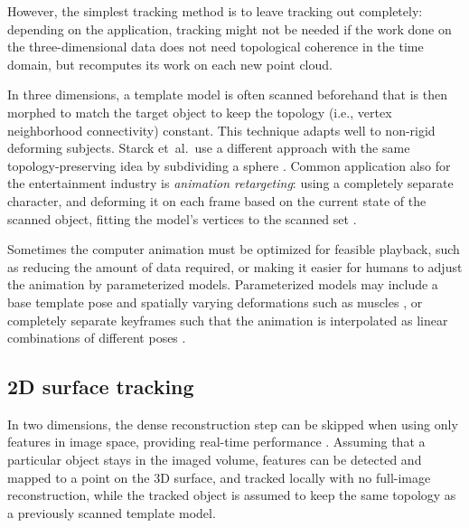 However, the simplest tracking method is to leave tracking out completely: depending on the application, tracking might not be needed if the work done on the three-dimensional data does not need topological coherence in the time domain, but recomputes its work on each new point cloud.


In three dimensions, a template model is often scanned beforehand that is then morphed to match the target object to keep the topology (i.e., vertex neighborhood connectivity) constant.
This technique adapts well to non-rigid deforming subjects. \cite{bojsen2012tracking,li2009robust}
Starck et~al.\ use a different approach with the same topology-preserving idea by subdividing a sphere \cite{starck2007surface}.
Common application also for the entertainment industry is \emph{animation retargeting}: using a completely separate character, and deforming it on each frame based on the current state of the scanned object, fitting the model's vertices to the scanned set \cite{sumner2004deformation}.

Sometimes the computer animation must be optimized for feasible playback, such as reducing the amount of data required, or making it easier for humans to adjust the animation by parameterized models.
Parameterized models may include a base template pose and spatially varying deformations such as muscles \cite{waters1987muscle}, or completely separate keyframes such that the animation is interpolated as linear combinations of different poses \cite{deng2007computer,beeler2011high}.


\subsection{2D surface tracking} %


In two dimensions, the dense reconstruction step can be skipped when using only features in image space, providing real-time performance \cite{pilet2005real}.
Assuming that a particular object stays in the imaged volume, features can be detected and mapped to a point on the 3D surface, and tracked locally with no full-image reconstruction, while the tracked object is assumed to keep the same topology as a previously scanned template model.

